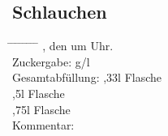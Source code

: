 \documentclass[12pt,oneside,a4paper]{scrartcl}
\begin{document}
\subsection*{Schlauchen}
	\begin{tabbing}
		\hspace{1cm} \= \hspace{1cm} \= \hspace{1cm} \= \hspace{1cm} \= \hspace{1cm} \= \hspace{1cm} \= \hspace{1cm} \= \hspace{1cm} \= \kill
		\> , den um Uhr.\\
		\> Zuckergabe: g/l\\
		\> Gesamtabfüllung: \> \> ,33l Flasche\\
		\> \> \> ,5l Flasche\\
		\> \> \> ,75l Flasche\\
		\> \> Kommentar: \> \>
		
	\end{tabbing}
\end{document}
